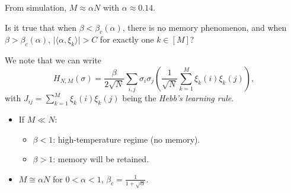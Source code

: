From simulation, \(M \approx \alpha N\) with \(\alpha \approx 0.14\).

\begin{problem*}
	Is it true that when \(\beta < \beta _c (\alpha )\), there is no memory phenomenon, and when \(\beta > \beta _c(\alpha )\), \(\lvert \langle \alpha , \xi _k \rangle  \rvert > C\) for exactly one \(k \in [M]\)?
\end{problem*}

We note that we can write
\[
	H_{N, M}(\sigma )
	= \frac{\beta }{2 \sqrt{N} } \sum_{i, j} \sigma _i \sigma _j \left( \frac{1}{\sqrt{N} } \sum_{k=1}^{M} \xi _k(i) \xi _k(j)\right),
\]
with \(J_{ij} = \sum_{k=1}^{M} \xi _k(i) \xi _k(j)\) being the \emph{Hebb's learning rule}.

\begin{theorem}
	\begin{itemize}
		\item If \(M\ll N\):
		      \begin{itemize}
			      \item \(\beta < 1\): high-temperature regime (no memory).
			      \item \(\beta > 1\): memory will be retained.
		      \end{itemize}
		\item \(M \cong \alpha N\) for \(0 < \alpha < 1\), \(\beta _c = \frac{1}{1 + \sqrt{\alpha } }\).
	\end{itemize}
\end{theorem}

